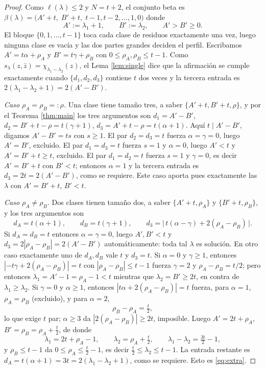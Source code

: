 \documentclass[11pt,reqno]{amsart}
\theoremstyle{plain}
\theoremstyle{definition}
\newcommand{\zb}{\bar z}
\begin{document}
\begin{proof}
Como $\ell(\lambda)\le 2$ y $N=t+2$, el conjunto beta es
$\beta(\lambda)=\bigl(A'+t,\;B'+t,\;t-1,t-2,\dots,1,0\bigr)$ donde
\[
A':=\lambda_1+1,\qquad B':=\lambda_2,\qquad A'>B'\ge0 .
\]
El bloque $\{0,1,\dots,t-1\}$ toca cada clase de residuos exactamente una vez, luego ninguna clase es
vacía y las dos partes grandes deciden el perfil. Escribamos $A'=t\alpha+\rho_A$ y
$B'=t\gamma+\rho_B$ con $0\le\rho_A,\rho_B\le t-1$. Como $s_\lambda(z,\zb)=\chi_{\lambda_1-\lambda_2}(z)$,
el Lema \ref{lem:single} dice que la afirmación se cumple exactamente cuando $\{d_1,d_2,d_3\}$
contiene $t$ dos veces y la tercera entrada es $2(\lambda_1-\lambda_2+1)=2(A'-B')$.

\emph{Caso $\rho_A=\rho_B=:\rho$.} Una clase tiene tamaño tres, a saber $\{A'+t,B'+t,\rho\}$, y por el
Teorema \ref{thm:main} los tres argumentos son $d_1=A'-B'$, $d_2=B'+t-\rho=t(\gamma+1)$,
$d_3=A'+t-\rho=t(\alpha+1)$. Aquí $t\mid A'-B'$, digamos $A'-B'=ts$ con $s\ge1$. El par $d_2=d_3=t$
fuerza $\alpha=\gamma=0$, luego $A'=B'$, excluido. El par $d_1=d_3=t$ fuerza $s=1$ y $\alpha=0$,
luego $A'<t$ y $A'=B'+t\ge t$, excluido. El par $d_1=d_2=t$ fuerza $s=1$ y $\gamma=0$, es decir
$A'=B'+t$ con $B'<t$; entonces $\alpha=1$ y la tercera entrada es $d_3=2t=2(A'-B')$, como se
requiere. Este caso aporta pues exactamente las $\lambda$ con $A'=B'+t$, $B'<t$.

\emph{Caso $\rho_A\ne\rho_B$.} Dos clases tienen tamaño dos, a saber $\{A'+t,\rho_A\}$ y
$\{B'+t,\rho_B\}$, y los tres argumentos son
\[
d_A=t(\alpha+1),\qquad d_B=t(\gamma+1),\qquad
d_3=\bigl|\,t(\alpha-\gamma)+2(\rho_A-\rho_B)\,\bigr| .
\]
Si $d_A=d_B=t$ entonces $\alpha=\gamma=0$, luego $A',B'<t$ y $d_3=2|\rho_A-\rho_B|=2(A'-B')$
automáticamente: toda tal $\lambda$ es solución. En otro caso exactamente uno de $d_A,d_B$ vale $t$ y
$d_3=t$. Si $\alpha=0$ y $\gamma\ge1$, entonces $|-t\gamma+2(\rho_A-\rho_B)|=t$ con
$|\rho_A-\rho_B|\le t-1$ fuerza $\gamma=2$ y $\rho_A-\rho_B=t/2$; pero entonces
$\lambda_1=A'-1=\rho_A-1<t$ mientras que $\lambda_2=B'\ge2t$, en contra de $\lambda_1\ge\lambda_2$.
Si $\gamma=0$ y $\alpha\ge1$, entonces $|t\alpha+2(\rho_A-\rho_B)|=t$ fuerza, para $\alpha=1$,
$\rho_A=\rho_B$ (excluido), y para $\alpha=2$,
\[
\rho_B-\rho_A=\tfrac t2,
\]
lo que exige $t$ par; $\alpha\ge3$ da $|2(\rho_A-\rho_B)|\ge2t$, imposible. Luego $A'=2t+\rho_A$,
$B'=\rho_B=\rho_A+\tfrac t2$, de donde
\[
\lambda_1=2t+\rho_A-1,\qquad \lambda_2=\rho_A+\tfrac t2,\qquad
\lambda_1-\lambda_2=\tfrac{3t}{2}-1,
\]
y $\rho_B\le t-1$ da $0\le\rho_A\le\tfrac t2-1$, es decir $\tfrac t2\le\lambda_2\le t-1$. La entrada
restante es $d_A=t(\alpha+1)=3t=2(\lambda_1-\lambda_2+1)$, como se requiere. Esto es
\eqref{eq:extra}.


\end{proof}
\end{document}
